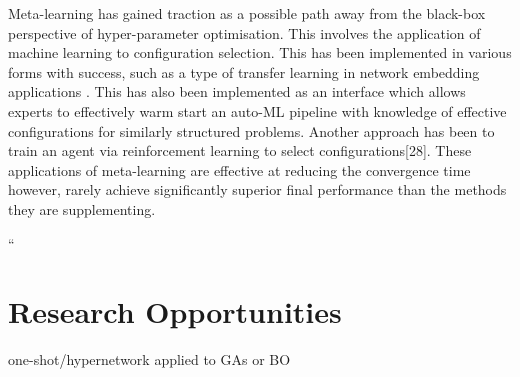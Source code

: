 \documentclass{article}
\begin{document}
	Meta-learning has gained traction as a possible path away from the black-box perspective of hyper-parameter optimisation. This involves the application of machine learning to configuration selection. This has been implemented in various forms with success, such as a type of transfer learning in network embedding applications \cite{9}. This has also been implemented as an interface which allows experts to effectively warm start an auto-ML pipeline with knowledge of effective configurations for similarly structured problems\cite{29}. Another approach has been to train an agent via reinforcement learning to select configurations[28]. These applications of meta-learning are effective at reducing the convergence time however, rarely achieve significantly superior final performance than the methods they are supplementing.\cite{31}\cite{29}

``


\section{Research Opportunities}

	one-shot/hypernetwork applied to GAs or BO



\printbibliography{}
\end{document}
